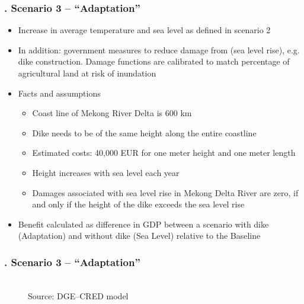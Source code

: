 \documentclass[11pt,aspectratio=169]{beamer}
\begin{document}
\begin{frame}
\frametitle{{\thesection.\thesubsection} Scenario 3 -- "`Adaptation"'}
\begin{itemize}
\item Increase in average temperature and sea level as defined in scenario 2 
\item In addition: government measures to reduce damage from (sea level rise), e.g. dike construction. Damage functions are calibrated to match percentage of agricultural land at risk of inundation
\item Facts and assumptions
	\begin{itemize}
		\item Coast line of Mekong River Delta is 600 km
		\item Dike needs to be of the same height along the entire coastline
		\item Estimated costs: 40,000 EUR for one meter height and one meter length 
		\item Height increases with sea level each year
		\item Damages associated with sea level rise in Mekong Delta River are zero, if and only if the height of the dike exceeds the sea level rise
	\end{itemize}
\item Benefit calculated as difference in GDP between a scenario with dike (Adaptation) and without dike (Sea Level) relative to the Baseline 
\end{itemize}
\end{frame}

\begin{frame}
\frametitle{{\thesection.\thesubsection} Scenario 3 -- "`Adaptation"'}
\begin{figure}
			\centering
			\\
			\footnotesize{Source: DGE--CRED model}
		\end{figure}
\end{frame}
\end{document}
